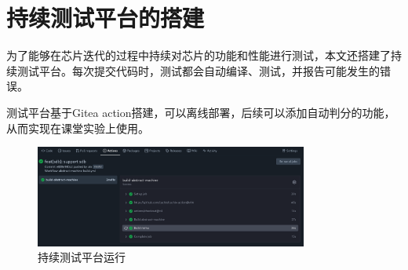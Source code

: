 \section{持续测试平台的搭建}

为了能够在芯片迭代的过程中持续对芯片的功能和性能进行测试，本文还搭建了持续测试平台。每次提交代码时，测试都会自动编译、测试，并报告可能发生的错误。

测试平台基于Gitea action搭建，可以离线部署，后续可以添加自动判分的功能，从而实现在课堂实验上使用。

\begin{figure}
    \centering
    \includegraphics[width=0.8\textwidth]{resources/test-ci.png}
    \caption{持续测试平台运行}
    \label{fig:test-ci}
\end{figure}

